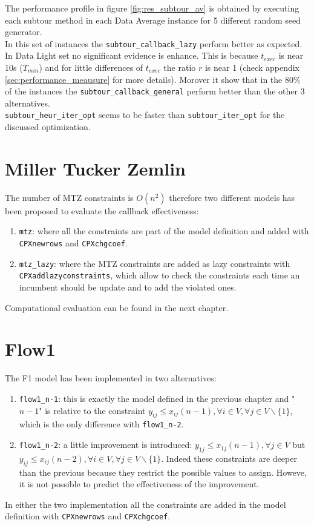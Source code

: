 The performance profile in figure \ref{fig:res_subtour_av} is obtained by executing each subtour method in each Data Average instance for 5 different random seed generator. \\
In this set of instances the \texttt{subtour\_callback\_lazy} perform better as expected. In Data Light set no significant evidence is enhance. This is because $ t_{exec} $ is near 10s ($ T_{min} $) and for little differences of $ t_{exec} $ the ratio $ r $ is near 1 (check appendix \ref{sec:performance_meausure} for more details).
Morover it show that in the $ 80\%  $  of the instances the \texttt{subtour\_callback\_general} perform better than the other 3 alternatives.\\
\texttt{subtour\_heur\_iter\_opt} seems to be faster than \texttt{subtour\_iter\_opt} for the discussed optimization. 


\section{Miller Tucker Zemlin}
The number of MTZ constraints is $O(n^2)$ therefore two different models has been proposed to evaluate the callback effectiveness:
\begin{enumerate}
	\item \texttt{mtz}: where all the constraints are part of the model definition and added with \texttt{CPXnewrows} and \texttt{CPXchgcoef}. 
	\item \texttt{mtz\_lazy}: where the MTZ constraints are added as lazy constraints with \texttt{CPXaddlazyconstraints}, which allow to check the constraints each time an incumbent should be update and to add the violated ones.
\end{enumerate}

Computational evaluation can be found in the next chapter.

\section{Flow1}
The F1 model has been implemented in two alternatives:
\begin{enumerate}
	\item \texttt{flow1\_n-1}: this is exactly the model defined in the previous chapter and "$ n-1 $" is relative to the constraint  $ y_{ij} \leq x_{ij} (n-1), \forall i \in V, \forall j \in V \backslash \{1\} $, which is the only difference with \texttt{flow1\_n-2}. 
	\item \texttt{flow1\_n-2}: a little improvement is introduced: $ y_{1j} \leq x_{1j}  (n-1), \forall j \in V $ but $ y_{ij} \leq x_{ij} (n-2), \forall i \in V, \forall j \in V \backslash \{1\} $. Indeed these constraints are deeper than the previous because they restrict the possible values to assign. Howeve, it is not possible to predict the effectiveness of the improvement.
\end{enumerate}
In either the two implementation all the constraints are added in the model definition with \texttt{CPXnewrows} and \texttt{CPXchgcoef}.

